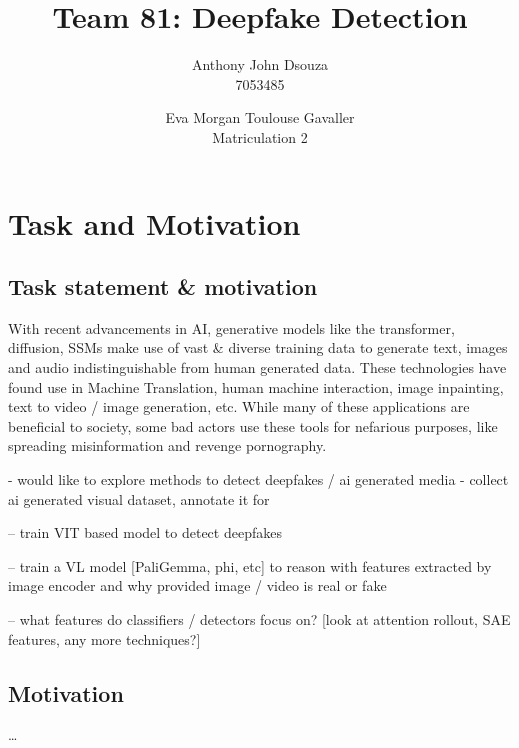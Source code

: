 \documentclass[10pt,twocolumn,letterpaper]{article}
\begin{document}
\title{Team 81: Deepfake Detection}

\author{
Anthony John Dsouza\\
7053485\\
\and
Eva Morgan Toulouse Gavaller\\
Matriculation 2\\
}
\maketitle

\section{Task and Motivation}
\subsection{Task statement \& motivation}
With recent advancements in AI, generative models like the transformer, diffusion, SSMs make use of vast \& diverse training data to generate text, images and audio indistinguishable from human generated data. These technologies have found use in Machine Translation, human machine interaction, image inpainting, text to video / image generation, etc. While many of these applications are beneficial to society, some bad actors use these tools for nefarious purposes, like spreading misinformation and revenge pornography. 

- would like to explore methods to detect deepfakes / ai generated media 
- collect ai generated visual dataset, annotate it for 


-- train VIT based model to detect deepfakes

-- train a VL model [PaliGemma, phi, etc] to reason with features extracted by image encoder and why provided image / video is real or fake

-- what features do classifiers / detectors focus on? [look at attention rollout, SAE features, any more techniques?]

\subsection{Motivation}
\ldots
\end{document}
